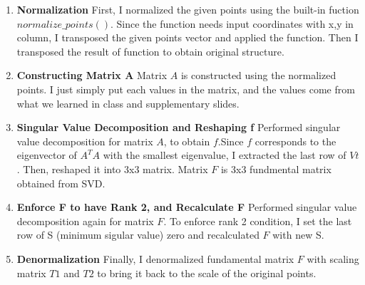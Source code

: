 \begin{enumerate}
    \item \textbf{Normalization}
    First, I normalized the given points using the built-in fuction $normalize\_points()$. Since the function needs input coordinates with x,y in column, I transposed the given points vector and applied the function.
    Then I transposed the result of function to obtain original structure.
    
    \item \textbf{Constructing Matrix A}
    Matrix $A$ is constructed using the normalized points. I just simply put each values in the matrix, and the values come from what we learned in class and supplementary slides.
    
    \item \textbf{Singular Value Decomposition and Reshaping f}
    Performed singular value decomposition for matrix $A$, to obtain $f$.Since $f$ corresponds to the eigenvector of $A^{T}A$ with the smallest eigenvalue, I extracted the last row of $Vt$. Then, reshaped it into 3{x}3 matrix. Matrix $F$ is 3{x}3 fundmental matrix obtained from SVD.
    
    \item \textbf{Enforce F to have Rank 2, and Recalculate F}
    Performed singular value decomposition again for matrix $F$. To enforce rank 2 condition, I set the last row of S (minimum sigular value) zero and recalculated $F$ with new S.
    
    \item \textbf{Denormalization}
    Finally, I denormalized fundamental matrix $F$ with scaling matrix $T1$ and $T2$ to bring it back to the scale of the original points.
\end{enumerate}

